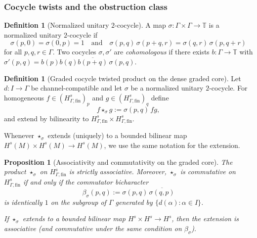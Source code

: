 \documentclass[11pt]{amsart}
\theoremstyle{plain}
\newtheorem{proposition}[theorem]{Proposition}
\theoremstyle{definition}
\newtheorem{definition}[theorem]{Definition}
\theoremstyle{remark}
\begin{document}
\subsubsection*{Cocycle twists and the obstruction class}

\begin{definition}[Normalized unitary $2$-cocycle]\label{def:2cocycle}
A map $\sigma:\Gamma\times\Gamma\to\mathbb{T}$ is a normalized unitary $2$-cocycle if
\[
\sigma(p,0)=\sigma(0,p)=1
\quad\text{and}\quad
\sigma(p,q)\,\sigma(p+q,r)=\sigma(q,r)\,\sigma(p,q+r)
\]
for all $p,q,r\in\Gamma$.
Two cocycles $\sigma,\sigma'$ are \emph{cohomologous} if there exists $b:\Gamma\to\mathbb{T}$ with
$\sigma'(p,q)=b(p)b(q)\overline{b(p+q)}\,\sigma(p,q)$.
\end{definition}

\begin{definition}[Graded cocycle twisted product on the dense graded core]\label{def:graded-cocycle-product}
Let $d:I\to\Gamma$ be channel-compatible and let $\sigma$ be a normalized unitary $2$-cocycle.
For homogeneous $f\in (H^s_{\Gamma,\mathrm{fin}})_p$ and $g\in (H^s_{\Gamma,\mathrm{fin}})_q$ define
\[
f\star_{\sigma} g:=\sigma(p,q)\,fg,
\]
and extend by bilinearity to $H^s_{\Gamma,\mathrm{fin}}\times H^s_{\Gamma,\mathrm{fin}}$.

Whenever $\star_\sigma$ extends (uniquely) to a bounded bilinear map $H^s(M)\times H^s(M)\to H^s(M)$, we use the same notation
for the extension.
\end{definition}

\begin{proposition}[Associativity and commutativity on the graded core]\label{prop:graded-assoc}
The product $\star_\sigma$ on $H^s_{\Gamma,\mathrm{fin}}$ is strictly associative.
Moreover, $\star_\sigma$ is commutative on $H^s_{\Gamma,\mathrm{fin}}$ if and only if the commutator bicharacter
\[
\beta_\sigma(p,q):=\sigma(p,q)\,\overline{\sigma(q,p)}
\]
is identically $1$ on the subgroup of $\Gamma$ generated by $\{d(\alpha):\alpha\in I\}$.

If $\star_\sigma$ extends to a bounded bilinear map $H^s\times H^s\to H^s$, then the extension is associative (and commutative
under the same condition on $\beta_\sigma$).
\end{proposition}
\end{document}
